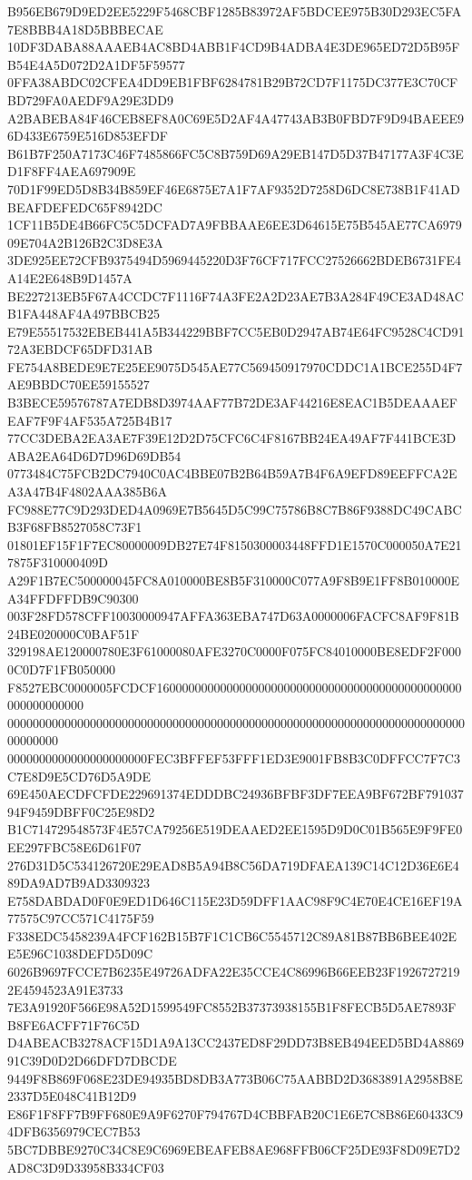 {{B956EB679D9ED2EE5229F5468CBF1285B83972AF5BDCEE975B30D293EC5FA7E8BBB4A18D5BBBECAE
10DF3DABA88AAAEB4AC8BD4ABB1F4CD9B4ADBA4E3DE965ED72D5B95FB54E4A5D072D2A1DF5F59577
0FFA38ABDC02CFEA4DD9EB1FBF6284781B29B72CD7F1175DC377E3C70CFBD729FA0AEDF9A29E3DD9
A2BABEBA84F46CEB8EF8A0C69E5D2AF4A47743AB3B0FBD7F9D94BAEEE96D433E6759E516D853EFDF
B61B7F250A7173C46F7485866FC5C8B759D69A29EB147D5D37B47177A3F4C3ED1F8FF4AEA697909E
70D1F99ED5D8B34B859EF46E6875E7A1F7AF9352D7258D6DC8E738B1F41ADBEAFDEFEDC65F8942DC
1CF11B5DE4B66FC5C5DCFAD7A9FBBAAE6EE3D64615E75B545AE77CA697909E704A2B126B2C3D8E3A
3DE925EE72CFB9375494D5969445220D3F76CF717FCC27526662BDEB6731FE4A14E2E648B9D1457A
BE227213EB5F67A4CCDC7F1116F74A3FE2A2D23AE7B3A284F49CE3AD48ACB1FA448AF4A497BBCB25
E79E55517532EBEB441A5B344229BBF7CC5EB0D2947AB74E64FC9528C4CD9172A3EBDCF65DFD31AB
FE754A8BEDE9E7E25EE9075D545AE77C569450917970CDDC1A1BCE255D4F7AE9BBDC70EE59155527
B3BECE59576787A7EDB8D3974AAF77B72DE3AF44216E8EAC1B5DEAAAEFEAF7F9F4AF535A725B4B17
77CC3DEBA2EA3AE7F39E12D2D75CFC6C4F8167BB24EA49AF7F441BCE3DABA2EA64D6D7D96D69DB54
0773484C75FCB2DC7940C0AC4BBE07B2B64B59A7B4F6A9EFD89EEFFCA2EA3A47B4F4802AAA385B6A
FC988E77C9D293DED4A0969E7B5645D5C99C75786B8C7B86F9388DC49CABCB3F68FB8527058C73F1
01801EF15F1F7EC80000009DB27E74F8150300003448FFD1E1570C000050A7E217875F310000409D
A29F1B7EC500000045FC8A010000BE8B5F310000C077A9F8B9E1FF8B010000EA34FFDFFDB9C90300
003F28FD578CFF10030000947AFFA363EBA747D63A0000006FACFC8AF9F81B24BE020000C0BAF51F
329198AE120000780E3F61000080AFE3270C0000F075FC84010000BE8EDF2F0000C0D7F1FB050000
F8527EBC0000005FCDCF160000000000000000000000000000000000000000000000000000000000
00000000000000000000000000000000000000000000000000000000000000000000000000000000
0000000000000000000000FEC3BFFEF53FFF1ED3E9001FB8B3C0DFFCC7F7C3C7E8D9E5CD76D5A9DE
69E450AECDFCFDE229691374EDDDBC24936BFBF3DF7EEA9BF672BF79103794F9459DBFF0C25E98D2
B1C714729548573F4E57CA79256E519DEAAED2EE1595D9D0C01B565E9F9FE0EE297FBC58E6D61F07
276D31D5C534126720E29EAD8B5A94B8C56DA719DFAEA139C14C12D36E6E489DA9AD7B9AD3309323
E758DABDAD0F0E9ED1D646C115E23D59DFF1AAC98F9C4E70E4CE16EF19A77575C97CC571C4175F59
F338EDC5458239A4FCF162B15B7F1C1CB6C5545712C89A81B87BB6BEE402EE5E96C1038DEFD5D09C
6026B9697FCCE7B6235E49726ADFA22E35CCE4C86996B66EEB23F19267272192E4594523A91E3733
7E3A91920F566E98A52D1599549FC8552B37373938155B1F8FECB5D5AE7893FB8FE6ACFF71F76C5D
D4ABEACB3278ACF15D1A9A13CC2437ED8F29DD73B8EB494EED5BD4A886991C39D0D2D66DFD7DBCDE
9449F8B869F068E23DE94935BD8DB3A773B06C75AABBD2D3683891A2958B8E2337D5E048C41B12D9
E86F1F8FF7B9FF680E9A9F6270F794767D4CBBFAB20C1E6E7C8B86E60433C94DFB6356979CEC7B53
5BC7DBBE9270C34C8E9C6969EBEAFEB8AE968FFB06CF25DE93F8D09E7D2AD8C3D9D33958B334CF03
}}
